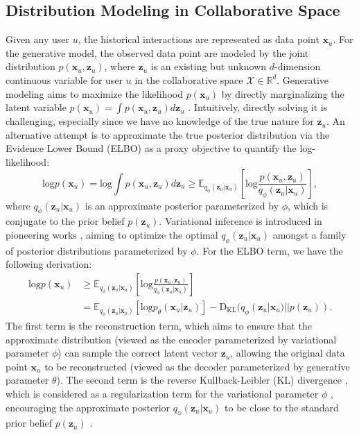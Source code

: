 \documentclass[sigconf]{acmart}
\begin{document}
\subsection{Distribution Modeling in Collaborative Space}
Given any user $u$, the historical interactions are represented as data point $\mathbf x_u$. For the generative model, the observed data point are modeled by the joint distribution $p(\mathbf x_u, \mathbf z_u)$, where $\mathbf z_u$ is an existing but unknown $d$-dimension continuous  variable for user $u$ in the collaborative space $\mathcal X \in \mathbb R^{d}$. Generative modeling aims to maximize the likelihood $p(\mathbf x_u)$ by directly marginalizing the latent variable $p(\mathbf x_u) =\int p(\mathbf x_u, \mathbf z_u)d\mathbf z_u $ \cite{luo2022understanding}. 
Intuitively, directly solving it is challenging, especially since we have no knowledge of the true nature for $\mathbf z_u$. An alternative attempt is to approximate the true posterior distribution via the Evidence Lower Bound (ELBO) \cite{kingma2013auto, luo2022understanding} as a  proxy objective to quantify the log-likelihood:
\begin{equation}
\label{likelihood}
\text{log}p(\mathbf x_u)=\text{log}\int p(\mathbf x_u, \mathbf z_u)d\mathbf z_u \ge \mathbb E_{q_{\phi}(\mathbf z_u|\mathbf x_u)}\left [\text{log}\frac{p(\mathbf x_u, \mathbf z_u)}{q_{\phi}(\mathbf z_u|\mathbf x_u)}    \right ],
\end{equation}
where $q_{\phi}(\mathbf z_u|\mathbf x_u)$ is an approximate posterior parameterized by $\phi$, which is conjugate to the prior belief $p(\mathbf z_u)$. Variational inference \cite{kingma2013auto, graves2011practical} is introduced in pioneering works \cite{li2017collaborative, liang2018variational}, aiming to optimize the optimal $q_{\phi}(\mathbf z_u|\mathbf x_u)$ amongst a family of posterior distributions parameterized by $\phi$. For the ELBO term, we have the following derivation:
\begin{equation}
\begin{aligned}
\label{elbo}
\text{log}p(\mathbf x_u) &\ge \mathbb E_{q_{\phi}(\mathbf z_u|\mathbf x_u)}\left [\text{log}\frac{p(\mathbf x_u, \mathbf z_u)}{q_{\phi}(\mathbf z_u|\mathbf x_u)}    \right ]\\
&= \mathbb E_{q_{\phi}(\mathbf z_u|\mathbf x_u)}[\text{log}p_{\theta}(\mathbf x_u|\mathbf z_u)] - \text{D}_{\text{KL}}(q_{\phi}(\mathbf z_u|\mathbf x_u)||p(\mathbf z_u)).
\end{aligned}
\end{equation}
The first term is the reconstruction term, which aims to ensure that the approximate distribution (viewed as the encoder parameterized by variational parameter $\phi$) can sample the correct latent vector $\mathbf z_u$, allowing the original data point $\mathbf x_u$ to be reconstructed (viewed as the decoder parameterized by generative parameter $\theta$). The second term is the reverse Kullback-Leibler (KL) divergence \cite{luo2022understanding}, which is considered as a regularization term for the variational parameter $\phi$ \cite{higgins2017beta, xu2020learning}, encouraging the approximate posterior $q_{\phi}(\mathbf z_u|\mathbf x_u)$ to be close to the standard prior belief $p(\mathbf z_u)$ \cite{liang2018variational}.
\end{document}
